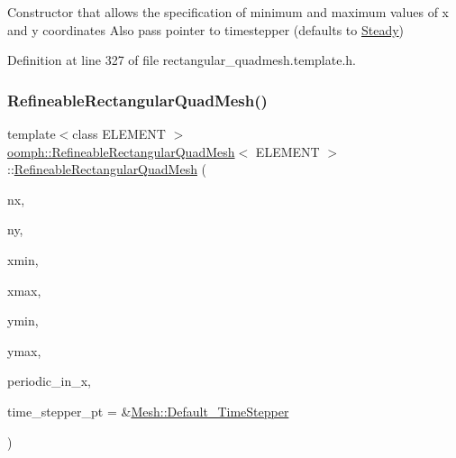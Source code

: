 Constructor that allows the specification of minimum and maximum values of x and y coordinates Also pass pointer to timestepper (defaults to \hyperlink{classoomph_1_1Steady}{Steady}) 



Definition at line 327 of file rectangular\+\_\+quadmesh.\+template.\+h.

\mbox{\label{classoomph_1_1RefineableRectangularQuadMesh_a4d9b146956f5b6c4df25afe9cb2a6e96}} 
\subsubsection{\texorpdfstring{Refineable\+Rectangular\+Quad\+Mesh()}{RefineableRectangularQuadMesh()}\hspace{0.1cm}{\footnotesize\ttfamily [4/4]}}
{\footnotesize\ttfamily template$<$class E\+L\+E\+M\+E\+NT $>$ \\
\hyperlink{classoomph_1_1RefineableRectangularQuadMesh}{oomph\+::\+Refineable\+Rectangular\+Quad\+Mesh}$<$ E\+L\+E\+M\+E\+NT $>$\+::\hyperlink{classoomph_1_1RefineableRectangularQuadMesh}{Refineable\+Rectangular\+Quad\+Mesh} (\begin{DoxyParamCaption}\item[{const unsigned \&}]{nx,  }\item[{const unsigned \&}]{ny,  }\item[{const double \&}]{xmin,  }\item[{const double \&}]{xmax,  }\item[{const double \&}]{ymin,  }\item[{const double \&}]{ymax,  }\item[{const bool \&}]{periodic\+\_\+in\+\_\+x,  }\item[{\hyperlink{classoomph_1_1TimeStepper}{Time\+Stepper} $\ast$}]{time\+\_\+stepper\+\_\+pt = {\ttfamily \&\hyperlink{classoomph_1_1Mesh_a12243d0fee2b1fcee729ee5a4777ea10}{Mesh\+::\+Default\+\_\+\+Time\+Stepper}} }\end{DoxyParamCaption})\hspace{0.3cm}{\ttfamily [inline]}}



